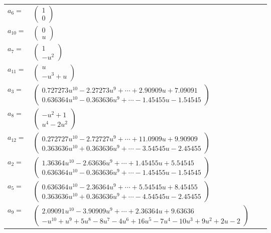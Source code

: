 \documentclass[1p]{elsarticle_modified}
\theoremstyle{definition}
\begin{document}
\begin{tabular}{m{7pt} m{180pt} m{7pt} m{180pt} }
\flushright $a_{6}=$&$\begin{pmatrix}1\\0\end{pmatrix}$ \\
\flushright $a_{10}=$&$\begin{pmatrix}0\\u\end{pmatrix}$ \\
\flushright $a_{7}=$&$\begin{pmatrix}1\\- u^2\end{pmatrix}$ \\
\flushright $a_{11}=$&$\begin{pmatrix}u\\- u^3+u\end{pmatrix}$ \\
\flushright $a_{3}=$&$\begin{pmatrix}0.727273 u^{10}-2.27273 u^{9}+\cdots+2.90909 u+7.09091\\0.636364 u^{10}-0.363636 u^{9}+\cdots-1.45455 u-1.54545\end{pmatrix}$ \\
\flushright $a_{8}=$&$\begin{pmatrix}- u^2+1\\u^4-2 u^2\end{pmatrix}$ \\
\flushright $a_{12}=$&$\begin{pmatrix}0.272727 u^{10}-2.72727 u^{9}+\cdots+11.0909 u+9.90909\\0.363636 u^{10}+0.363636 u^{9}+\cdots-3.54545 u-2.45455\end{pmatrix}$ \\
\flushright $a_{2}=$&$\begin{pmatrix}1.36364 u^{10}-2.63636 u^{9}+\cdots+1.45455 u+5.54545\\0.636364 u^{10}-0.363636 u^{9}+\cdots-1.45455 u-1.54545\end{pmatrix}$ \\
\flushright $a_{5}=$&$\begin{pmatrix}0.636364 u^{10}-2.36364 u^{9}+\cdots+5.54545 u+8.45455\\0.363636 u^{10}+0.363636 u^{9}+\cdots-4.54545 u-2.45455\end{pmatrix}$ \\
\flushright $a_{9}=$&$\begin{pmatrix}2.09091 u^{10}-3.90909 u^{9}+\cdots+2.36364 u+9.63636\\- u^{10}+u^9+5 u^8-8 u^7-4 u^6+16 u^5-7 u^4-10 u^3+9 u^2+2 u-2\end{pmatrix}$ \\

\end{tabular}
\end{document}
